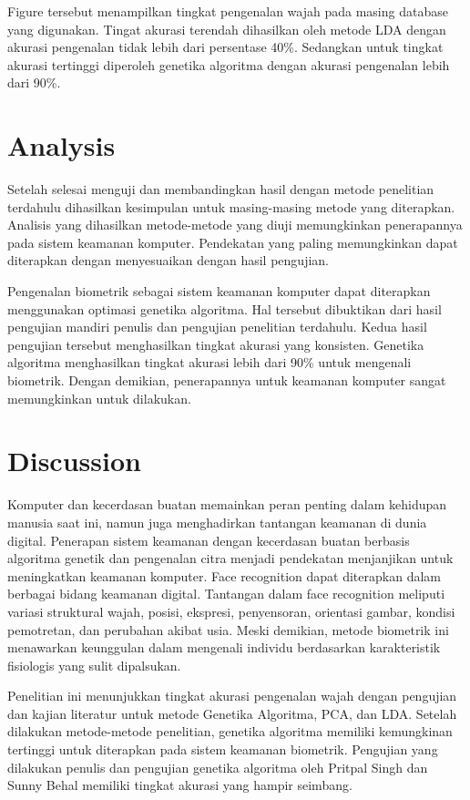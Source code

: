 \documentclass[conference]{IEEEtran}
\begin{document}
Figure tersebut menampilkan tingkat pengenalan wajah pada masing database yang digunakan. Tingat akurasi terendah dihasilkan oleh metode LDA dengan akurasi pengenalan tidak lebih dari persentase 40\%. Sedangkan untuk tingkat akurasi tertinggi diperoleh genetika algoritma dengan akurasi pengenalan lebih dari 90\%.

\section{Analysis}

Setelah selesai menguji dan membandingkan hasil dengan metode penelitian terdahulu dihasilkan kesimpulan untuk masing-masing metode yang diterapkan. Analisis yang dihasilkan metode-metode yang diuji memungkinkan penerapannya pada sistem keamanan komputer. Pendekatan yang paling memungkinkan dapat diterapkan dengan menyesuaikan dengan hasil pengujian. 

Pengenalan biometrik sebagai sistem keamanan komputer dapat diterapkan menggunakan optimasi genetika algoritma. Hal tersebut dibuktikan dari hasil pengujian mandiri penulis dan pengujian penelitian terdahulu. Kedua hasil pengujian tersebut menghasilkan tingkat akurasi yang konsisten. Genetika algoritma menghasilkan tingkat akurasi lebih dari 90\% untuk mengenali biometrik. Dengan demikian, penerapannya untuk keamanan komputer sangat memungkinkan untuk dilakukan.

\section{Discussion}
Komputer dan kecerdasan buatan memainkan peran penting dalam kehidupan manusia saat ini, namun juga menghadirkan tantangan keamanan di dunia digital. Penerapan sistem keamanan dengan kecerdasan buatan berbasis algoritma genetik dan pengenalan citra menjadi pendekatan menjanjikan untuk meningkatkan keamanan komputer. Face recognition dapat diterapkan dalam berbagai bidang keamanan digital. Tantangan dalam face recognition meliputi variasi struktural wajah, posisi, ekspresi, penyensoran, orientasi gambar, kondisi pemotretan, dan perubahan akibat usia. Meski demikian, metode biometrik ini menawarkan keunggulan dalam mengenali individu berdasarkan karakteristik fisiologis yang sulit dipalsukan. 

Penelitian ini menunjukkan tingkat akurasi pengenalan wajah dengan pengujian dan kajian literatur untuk metode Genetika Algoritma, PCA, dan LDA. Setelah dilakukan metode-metode penelitian, genetika algoritma memiliki kemungkinan tertinggi untuk diterapkan pada sistem keamanan biometrik. Pengujian yang dilakukan penulis dan pengujian genetika algoritma oleh Pritpal Singh dan Sunny Behal memiliki tingkat akurasi yang hampir seimbang.
\end{document}
